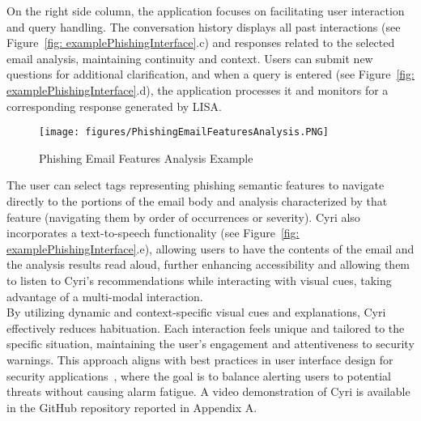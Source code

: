 On the right side column, the application focuses on facilitating user interaction and query handling. The conversation history displays all past interactions (see Figure~\ref{fig: examplePhishingInterface}.c) and responses related to the selected email analysis, maintaining continuity and context. Users can submit new questions for additional clarification, and when a query is entered (see Figure~\ref{fig: examplePhishingInterface}.d), the application processes it and monitors for a corresponding response generated by LISA. 

\begin{figure}[htbp]
  \centering
  \texttt{[image: figures/PhishingEmailFeaturesAnalysis.PNG]}
  \caption{Phishing Email Features Analysis Example}
  \label{fig: exampleFeaturesInterface}
\end{figure}

The user can select tags representing phishing semantic features to navigate directly to the portions of the email body and analysis characterized by that feature (navigating them by order of occurrences or severity). 
Cyri also incorporates a text-to-speech functionality (see Figure~\ref{fig: examplePhishingInterface}.e), allowing users to have the contents of the email and the analysis results read aloud, further enhancing accessibility and allowing them to listen to Cyri's recommendations while interacting with visual cues, taking advantage of a multi-modal interaction.
\\
By utilizing dynamic and context-specific visual cues and explanations, Cyri effectively reduces habituation. Each interaction feels unique and tailored to the specific situation, maintaining the user's engagement and attentiveness to security warnings. This approach aligns with best practices in user interface design for security applications~\cite{b22, b23}, where the goal is to balance alerting users to potential threats without causing alarm fatigue.
A video demonstration of Cyri is available in the GitHub repository reported in Appendix A.

